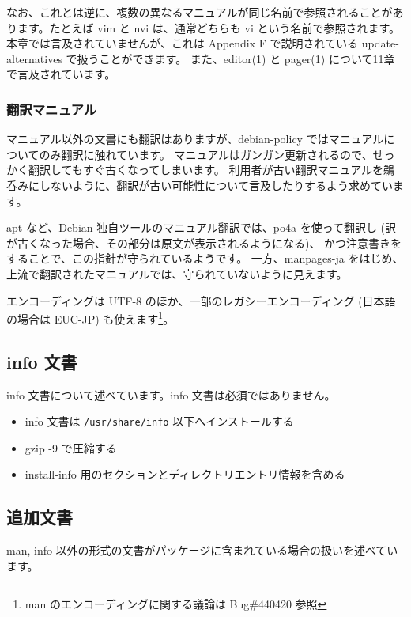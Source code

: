 \documentclass[mingoth,a4paper]{jsarticle}
\begin{document}
なお、これとは逆に、複数の異なるマニュアルが同じ名前で参照されることがあります。たとえば vim と nvi は、通常どちらも vi という名前で参照されます。
本章では言及されていませんが、これは Appendix F で説明されている update-alternatives で扱うことができます。
また、editor(1) と pager(1) について11章で言及されています。

\subsubsection{翻訳マニュアル}

マニュアル以外の文書にも翻訳はありますが、debian-policy ではマニュアルについてのみ翻訳に触れています。
マニュアルはガンガン更新されるので、せっかく翻訳してもすぐ古くなってしまいます。
利用者が古い翻訳マニュアルを鵜呑みにしないように、翻訳が古い可能性について言及したりするよう求めています。

apt など、Debian 独自ツールのマニュアル翻訳では、po4a を使って翻訳し (訳が古くなった場合、その部分は原文が表示されるようになる)、
かつ注意書きをすることで、この指針が守られているようです。
一方、manpages-ja をはじめ、上流で翻訳されたマニュアルでは、守られていないように見えます。

エンコーディングは UTF-8 のほか、一部のレガシーエンコーディング (日本語の場合は EUC-JP) も使えます\footnote{man のエンコーディングに関する議論は Bug\#440420 参照}。

\subsection{info 文書}

info 文書について述べています。info 文書は必須ではありません。

\begin{itemize}
\item info 文書は {\tt /usr/share/info} 以下へインストールする
\item gzip -9 で圧縮する
\item install-info 用のセクションとディレクトリエントリ情報を含める
\end{itemize}

\subsection{追加文書}

man, info 以外の形式の文書がパッケージに含まれている場合の扱いを述べています。
\end{document}
